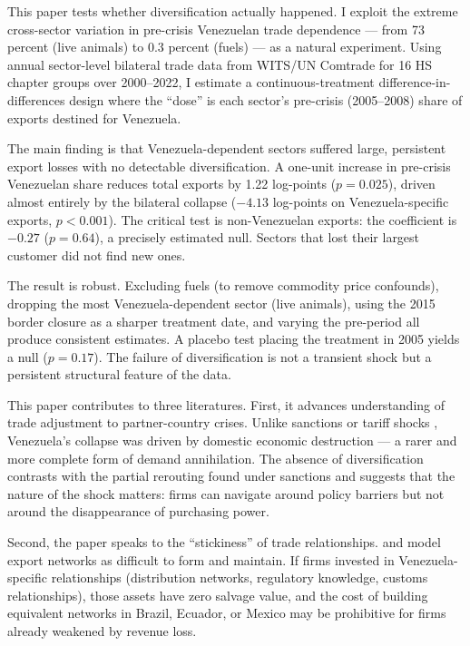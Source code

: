 \documentclass[12pt]{article}
\begin{document}
This paper tests whether diversification actually happened. I exploit the extreme cross-sector variation in pre-crisis Venezuelan trade dependence --- from 73 percent (live animals) to 0.3 percent (fuels) --- as a natural experiment. Using annual sector-level bilateral trade data from WITS/UN Comtrade for 16 HS chapter groups over 2000--2022, I estimate a continuous-treatment difference-in-differences design where the ``dose'' is each sector's pre-crisis (2005--2008) share of exports destined for Venezuela.

The main finding is that Venezuela-dependent sectors suffered large, persistent export losses with no detectable diversification. A one-unit increase in pre-crisis Venezuelan share reduces total exports by 1.22 log-points ($p = 0.025$), driven almost entirely by the bilateral collapse ($-4.13$ log-points on Venezuela-specific exports, $p < 0.001$). The critical test is non-Venezuelan exports: the coefficient is $-0.27$ ($p = 0.64$), a precisely estimated null. Sectors that lost their largest customer did not find new ones.

The result is robust. Excluding fuels (to remove commodity price confounds), dropping the most Venezuela-dependent sector (live animals), using the 2015 border closure as a sharper treatment date, and varying the pre-period all produce consistent estimates. A placebo test placing the treatment in 2005 yields a null ($p = 0.17$). The failure of diversification is not a transient shock but a persistent structural feature of the data.

This paper contributes to three literatures. First, it advances understanding of trade adjustment to partner-country crises. Unlike sanctions \citep{crozet2020friendly} or tariff shocks \citep{fajgelbaum2020return}, Venezuela's collapse was driven by domestic economic destruction --- a rarer and more complete form of demand annihilation. The absence of diversification contrasts with the partial rerouting found under sanctions and suggests that the nature of the shock matters: firms can navigate around policy barriers but not around the disappearance of purchasing power.

Second, the paper speaks to the ``stickiness'' of trade relationships. \citet{chaney2014network} and \citet{bernard2018networks} model export networks as difficult to form and maintain. If firms invested in Venezuela-specific relationships (distribution networks, regulatory knowledge, customs relationships), those assets have zero salvage value, and the cost of building equivalent networks in Brazil, Ecuador, or Mexico may be prohibitive for firms already weakened by revenue loss.
\end{document}
